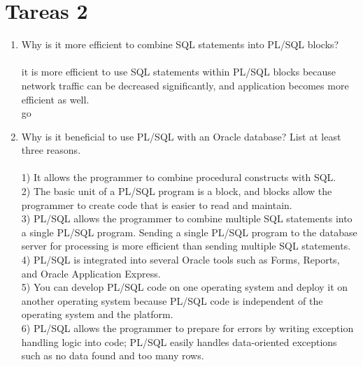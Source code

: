 \section{Tareas 2} 

\begin{enumerate}[1.]
	\item Why is it more efficient to combine SQL statements into PL/SQL blocks?
	\\
	\\it is more efficient to use SQL statements within PL/SQL blocks because network traffic can be decreased significantly, and application becomes more efficient as well.
	\\ go
	\\ 
	\item Why is it beneficial to use PL/SQL with an Oracle database? List at least three reasons. 
	\\
	\\1) It allows the programmer to combine procedural constructs with SQL.
\\2) The basic unit of a PL/SQL program is a block, and blocks allow the
programmer to create code that is easier to read and maintain.
\\3) PL/SQL allows the programmer to combine multiple SQL statements into a
single PL/SQL program. Sending a single PL/SQL program to the database
server for processing is more efficient than sending multiple SQL statements.
\\4) PL/SQL is integrated into several Oracle tools such as Forms, Reports, and
Oracle Application Express.
\\5) You can develop PL/SQL code on one operating system and deploy it on another
operating system because PL/SQL code is independent of the operating system
and the platform.
\\6) PL/SQL allows the programmer to prepare for errors by writing exception
handling logic into code; PL/SQL easily handles data-oriented exceptions such
as no data found and too many rows. 
	\\


\end{enumerate}
